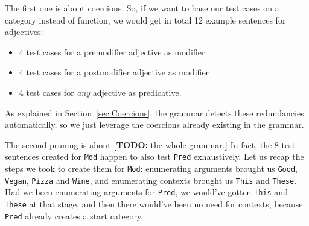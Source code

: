 \documentclass[runningheads]{llncs}
\def\t#1{\texttt{#1}}
\def\pmcfg{\textsc{pmcfg}}
\newcommand{\quality}[1]{${\tt Quality_{#1}}$}
\newcommand{\very}[1]{${\tt Very_{#1}}$}
\newcommand{\todo}[1]{{\color{cyan}\textbf{[TODO: }#1\textbf{]}}}
\begin{document}
The first one is about coercions.
So, if we want to base our test cases on a category instead of
function, we would get in total 12 example sentences for adjectives:
\begin{itemize}
\item 4 test cases for a premodifier adjective as modifier
\item 4 test cases for a postmodifier adjective as modifier
\item 4 test cases for \emph{any} adjective as predicative.
\end{itemize}
 As explained in Section~\ref{sec:Coercions}, the grammar detects
these redundancies automatically, so we just leverage the coercions
already existing in the grammar.


The second pruning is about \todo{the whole grammar.} In fact, the 8 test
sentences created for \t{Mod} happen to also test \t{Pred} exhaustively.
Let us recap the steps we took to create them for \t{Mod}:
enumerating arguments brought us \t{Good}, \t{Vegan}, \t{Pizza} and
\t{Wine}, and enumerating contexts brought us \t{This} and
\t{These}. Had we been enumerating arguments for \t{Pred}, we would've
gotten \t{This} and \t{These} at that stage, and then there would've
been no need for contexts, because \t{Pred} already creates a start category.


\end{document}
